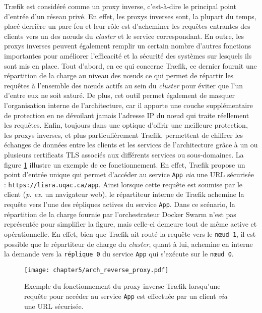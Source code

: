 Tr\ae{}fik est considéré comme un proxy inverse, c'est-à-dire le principal point d'entrée d'un réseau privé. En effet, les proxys inverses sont, la plupart du temps, placé derrière un pare-feu et leur rôle est d'acheminer les requêtes entrantes des clients vers un des n\oe{}uds du \textit{cluster} et le service correspondant. En outre, les proxys inverses peuvent également remplir un certain nombre d'autres fonctions importantes pour améliorer l'efficacité et la sécurité des systèmes sur lesquels ils sont mis en place. Tout d'abord, en ce qui concerne Tr\ae{}fik, ce dernier fournit une répartition de la charge au niveau des n\oe{}uds ce qui permet de répartir les requêtes à l'ensemble des n\oe{}uds actifs au sein du \textit{cluster} pour éviter que l'un d'entre eux ne soit saturé. De plus, cet outil permet également de masquer l'organisation interne de l'architecture, car il apporte une couche supplémentaire de protection en ne dévoilant jamais l'adresse IP du n\oe{}ud qui traite réellement les requêtes. Enfin, toujours dans une optique d'offrir une meilleure protection, les proxys inverses, et plus particulièrement Tr\ae{}fik, permettent de chiffrer les échanges de données entre les clients et les services de l'architecture grâce à un ou plusieurs certificats \acs{TLS} associés aux différents services ou sous-domaines. La figure \ref{fig:arch_reverse_proxy} illustre un exemple de ce fonctionnement. En effet, Tr\ae{}fik propose un point d'entrée unique qui permet d'accéder au service \texttt{App} \textit{via} une \acs{URL} sécurisée : \texttt{https://liara.uqac.ca/app}. Ainsi lorsque cette requête est soumise par le client (\textit{p. ex. } un navigateur web), le répartiteur interne de Tr\ae{}fik achemine la requête vers l'une des répliques actives du service \texttt{App}. Dans ce scénario, la répartition de la charge fournie par l'orchestrateur Docker Swarm n'est pas représentée pour simplifier la figure, mais celle-ci demeure tout de même active et opérationnelle. En effet, bien que Tr\ae{}fik ait routé la requête vers le \texttt{n\oe{}ud 1}, il est possible que le répartiteur de charge du \textit{cluster}, quant à lui, achemine en interne la demande vers la \texttt{réplique 0} du service \texttt{App} qui s'exécute sur le \texttt{n\oe{}ud 0}.

\begin{figure}[H]
	\centering
	\texttt{[image: chapter5/arch\_reverse\_proxy.pdf]}
        \caption{Exemple du fonctionnement du proxy inverse Tr\ae{}fik lorsqu'une requête pour accéder au service \texttt{App} est effectuée par un client \textit{via} une \acs{URL} sécurisée.}
	\label{fig:arch_reverse_proxy}
\end{figure}

